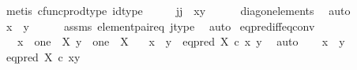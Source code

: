 \begin{isabellebody}
\ {\isacharparenleft}{\kern0pt}metis\ cfunc{\isacharunderscore}{\kern0pt}prod{\isacharunderscore}{\kern0pt}type\ id{\isacharunderscore}{\kern0pt}type{\isacharparenright}{\kern0pt}\isanewline
\ \ \isamarkupfalse%
\ \isamarkupfalse%
\ {\isachardoublequoteopen}{\isasymlangle}j{\isacharcomma}{\kern0pt}j{\isasymrangle}\ {\isacharequal}{\kern0pt}\ {\isasymlangle}x{\isacharcomma}{\kern0pt}y{\isasymrangle}{\isachardoublequoteclose}\isanewline
\ \ \ \ \isamarkupfalse%
\ diag{\isacharunderscore}{\kern0pt}on{\isacharunderscore}{\kern0pt}elements\ \isamarkupfalse%
\ auto\isanewline
\ \ \isamarkupfalse%
\ \isamarkupfalse%
\ {\isachardoublequoteopen}x\ {\isacharequal}{\kern0pt}\ y{\isachardoublequoteclose}\isanewline
\ \ \ \ \isamarkupfalse%
\ assms\ element{\isacharunderscore}{\kern0pt}pair{\isacharunderscore}{\kern0pt}eq\ j{\isacharunderscore}{\kern0pt}type\ \isamarkupfalse%
\ auto\isanewline
{}\isamarkupfalse%
%
\endisatagproof
{\isafoldproof}%
%
\isadelimproof
\isanewline
%
\endisadelimproof
\isanewline
{}\isamarkupfalse%
\ eq{\isacharunderscore}{\kern0pt}pred{\isacharunderscore}{\kern0pt}iff{\isacharunderscore}{\kern0pt}eq{\isacharunderscore}{\kern0pt}conv{\isacharcolon}{\kern0pt}\isanewline
\ \ \ {\isachardoublequoteopen}x\ {\isacharcolon}{\kern0pt}\ one\ {\isasymrightarrow}\ X{\isachardoublequoteclose}\ {\isachardoublequoteopen}y\ {\isacharcolon}{\kern0pt}\ one\ {\isasymrightarrow}\ X{\isachardoublequoteclose}\isanewline
\ \ \ {\isachardoublequoteopen}{\isacharparenleft}{\kern0pt}x\ {\isasymnoteq}\ y{\isacharparenright}{\kern0pt}\ {\isacharequal}{\kern0pt}\ {\isacharparenleft}{\kern0pt}eq{\isacharunderscore}{\kern0pt}pred\ X\ {\isasymcirc}\isactrlsub c\ {\isasymlangle}x{\isacharcomma}{\kern0pt}\ y{\isasymrangle}\ {\isacharequal}{\kern0pt}\ {\isasymf}{\isacharparenright}{\kern0pt}{\isachardoublequoteclose}\isanewline
%
\isadelimproof
%
\endisadelimproof
%
\isatagproof
{}\isamarkupfalse%
{\isacharparenleft}{\kern0pt}auto{\isacharparenright}{\kern0pt}\isanewline
\ \ \isamarkupfalse%
\ {\isachardoublequoteopen}x\ {\isasymnoteq}\ y{\isachardoublequoteclose}\isanewline
\ \ \isamarkupfalse%
\ \isamarkupfalse%
\ {\isachardoublequoteopen}eq{\isacharunderscore}{\kern0pt}pred\ X\ {\isasymcirc}\isactrlsub c\ {\isasymlangle}x{\isacharcomma}{\kern0pt}y{\isasymrangle}\ {\isacharequal}{\kern0pt}\ {\isasymf}{\isachardoublequoteclose}\isanewline

\end{isabellebody}
